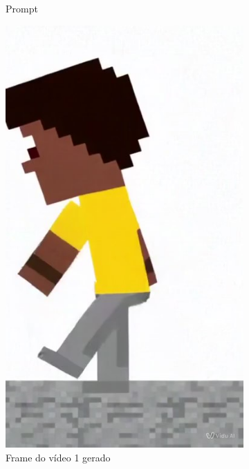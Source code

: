 \begin{figure}[htbp]
\begin{subfigure}{0.4\linewidth}
        \caption{\small Prompt}
        \label{fig:vidu2a}
    \end{subfigure}
    \begin{subfigure}{0.2\linewidth}
        \includegraphics[width=1\linewidth]{figs/vidu/frame4.jpg}
        \caption{\small Frame do vídeo 1 gerado}
        \label{fig:vidu2b}
    \end{subfigure}
    \begin{subfigure}{0.2
    \linewidth}

\end{subfigure}
\end{figure}
